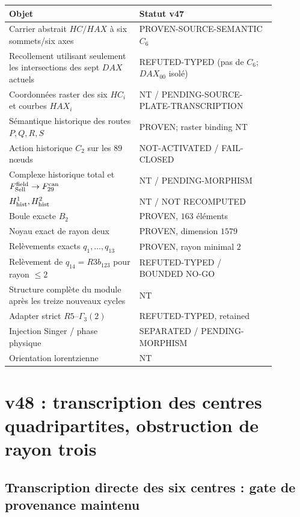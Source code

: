\documentclass[11pt,a4paper]{article}
\begin{document}
\begin{center}
\begin{tabular}{p{0.43\linewidth}p{0.45\linewidth}}
\toprule
Objet & Statut v47\\
\midrule
Carrier abstrait $HC/HAX$ à six sommets/six axes & PROVEN-SOURCE-SEMANTIC $C_6$\\
Recollement utilisant seulement les intersections des sept $DAX$ actuels & REFUTED-TYPED (pas de $C_6$; $DAX_{00}$ isolé)\\
Coordonnées raster des six $HC_i$ et courbes $HAX_i$ & NT / PENDING-SOURCE-PLATE-TRANSCRIPTION\\
Sémantique historique des routes $P,Q,R,S$ & PROVEN; raster binding NT\\
Action historique $C_2$ sur les $89$ nœuds & NOT-ACTIVATED / FAIL-CLOSED\\
Complexe historique total et $F_{\rm Sell}^{\rm field}\to F_{29}^{\rm can}$ & NT / PENDING-MORPHISM\\
$H^1_{\rm hist},H^2_{\rm hist}$ & NT / NOT RECOMPUTED\\
Boule exacte $B_2$ & PROVEN, $163$ éléments\\
Noyau exact de rayon deux & PROVEN, dimension $1579$\\
Relèvements exacts $q_1,\ldots,q_{13}$ & PROVEN, rayon minimal $2$\\
Relèvement de $q_{14}=R3b_{123}$ pour rayon $\le2$ & REFUTED-TYPED / BOUNDED NO-GO\\
Structure complète du module après les treize nouveaux cycles & NT\\
Adapter strict $R5$--$\Gamma_3(2)$ & REFUTED-TYPED, retained\\
Injection Singer / phase physique & SEPARATED / PENDING-MORPHISM\\
Orientation lorentzienne & NT\\
\bottomrule
\end{tabular}
\end{center}



\section{v48 : transcription des centres quadripartites, obstruction de rayon trois }\label{sec:v48-centres-radius3-order}


\subsection{Transcription directe des six centres : gate de provenance maintenu}
\end{document}
